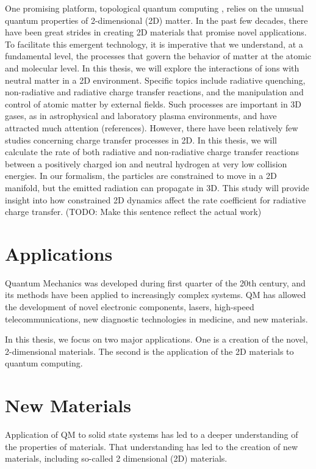 One promising platform, topological quantum computing \cite{Tqc1,Tqc2,Tqc3, Tqc4, Tqc5}, relies on the unusual quantum properties of 2-dimensional (2D) matter. In the past few decades, there have been great strides in creating 2D materials that promise novel applications.\cite{Nature2D}
To facilitate this emergent technology, it is imperative that we understand, at a fundamental level, the processes that govern the behavior of matter at the atomic and molecular level. In this thesis, we will explore the interactions of ions with neutral matter in a 2D environment. Specific topics include radiative quenching, non-radiative and radiative charge transfer reactions, and the manipulation and control of atomic matter by external fields. Such processes are important in 3D gases,
as in astrophysical and laboratory plasma environments, and have attracted much attention \cite{plasma}
(references). 
However, there have been relatively few studies concerning charge transfer processes in 2D.
In this thesis, we will calculate the rate of both radiative 
and non-radiative charge transfer reactions between a positively charged ion and neutral hydrogen at very low collision energies. In our formalism, the particles are constrained to move in a 2D manifold, but the emitted radiation can propagate in 3D. This study will provide insight into how constrained 2D dynamics affect the rate coefficient for radiative charge transfer.
 (TODO: Make this sentence reflect the actual work)

\section{Applications}
Quantum Mechanics was developed during first quarter of the 20th century, and its methods have been applied to increasingly complex systems. QM has allowed the development of novel electronic components, lasers, high-speed telecommunications, new diagnostic technologies in medicine, and new materials.

 In this thesis, we focus on two major applications.
 One is a creation of the novel, 2-dimensional materials.
 The second is the application of the 2D materials to quantum computing.
 
 \section{New Materials}

Application of QM to solid state systems has led to a deeper understanding of the properties of materials. That understanding has led to the creation of new materials, including so-called 2 dimensional (2D) materials.
 
